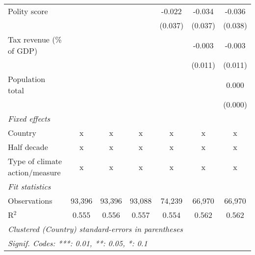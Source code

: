 \begin{tabular}{lcccccc}
   Polity score                                                 &         &                &                & -0.022         & -0.034         & -0.036\\   
                                                                &         &                &                & (0.037)        & (0.037)        & (0.038)\\   
   Tax revenue (\% of GDP)                                      &         &                &                &                & -0.003         & -0.003\\   
                                                                &         &                &                &                & (0.011)        & (0.011)\\   
   Population total                                             &         &                &                &                &                & 0.000\\   
                                                                &         &                &                &                &                & (0.000)\\   
   \emph{Fixed effects}\\
   Country                                                      & x       & x              & x              & x              & x              & x\\  
   Half decade                                                  & x       & x              & x              & x              & x              & x\\  
   Type of climate action/measure                               & x       & x              & x              & x              & x              & x\\  
   \midrule \emph{Fit statistics}\\
   Observations                                                 & 93,396  & 93,396         & 93,088         & 74,239         & 66,970         & 66,970\\  
   R$^2$                                                        & 0.555   & 0.556          & 0.557          & 0.554          & 0.562          & 0.562\\  
   \midrule
   \multicolumn{7}{l}{\emph{Clustered (Country) standard-errors in parentheses}}\\
   \multicolumn{7}{l}{\emph{Signif. Codes: ***: 0.01, **: 0.05, *: 0.1}}\\
\end{tabular}
\par\endgroup


